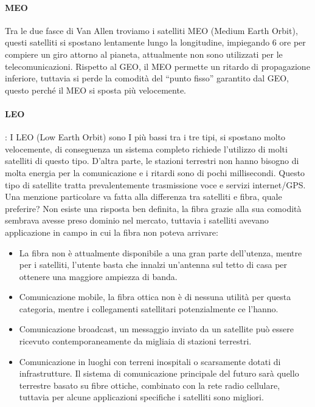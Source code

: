\paragraph{MEO}
Tra le due fasce di Van Allen troviamo i satelliti MEO (Medium Earth Orbit), questi satelliti si spostano lentamente lungo la longitudine, impiegando 6 ore per compiere un giro attorno al pianeta, attualmente non sono utilizzati per le telecomunicazioni. Rispetto al GEO, il MEO permette un ritardo di propagazione inferiore, tuttavia si perde la comodità del “punto fisso” garantito dal GEO, questo perché il MEO si sposta più velocemente.
\paragraph{LEO}:
I LEO (Low Earth Orbit) sono I più bassi tra i tre tipi, si spostano molto velocemente, di conseguenza un sistema completo richiede l’utilizzo di molti satelliti di questo tipo. D’altra parte, le stazioni terrestri non hanno bisogno di molta energia per la comunicazione e i ritardi sono di pochi millisecondi.
Questo tipo di satellite tratta prevalentemente trasmissione voce e servizi internet/GPS. \\

Una menzione particolare va fatta alla differenza tra satelliti e fibra, quale preferire? 
Non esiste una risposta ben definita, la fibra grazie alla sua comodità sembrava avesse preso dominio nel mercato, tuttavia i satelliti avevano applicazione in campo in cui la fibra non poteva arrivare:
\begin{itemize}
\item	La fibra non è attualmente disponibile a una gran parte dell’utenza, mentre per i satelliti, l’utente basta che innalzi un’antenna sul tetto di casa per ottenere una maggiore ampiezza di banda.
\item	Comunicazione mobile, la fibra ottica non è di nessuna utilità per questa categoria, mentre i collegamenti satellitari potenzialmente ce l’hanno.
\item	Comunicazione broadcast, un messaggio inviato da un satellite può essere ricevuto contemporaneamente da migliaia di stazioni terrestri.
\item	Comunicazione in luoghi con terreni inospitali o scarsamente dotati di infrastrutture.
Il sistema di comunicazione principale del futuro sarà quello terrestre basato su fibre ottiche, combinato con la rete radio cellulare, tuttavia per alcune applicazioni specifiche i satelliti sono migliori.
\end{itemize}


